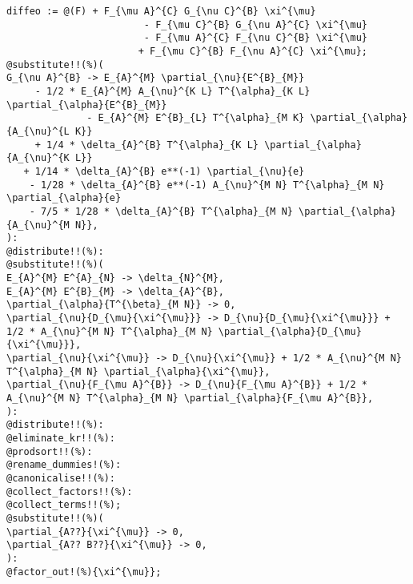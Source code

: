 \documentclass[11pt]{article}
\begin{document}
{\color[named]{Blue}\begin{verbatim}
diffeo := @(F) + F_{\mu A}^{C} G_{\nu C}^{B} \xi^{\mu}
                        - F_{\mu C}^{B} G_{\nu A}^{C} \xi^{\mu}
                        - F_{\mu A}^{C} F_{\nu C}^{B} \xi^{\mu}
                       + F_{\mu C}^{B} F_{\nu A}^{C} \xi^{\mu};
@substitute!!(%)(
G_{\nu A}^{B} -> E_{A}^{M} \partial_{\nu}{E^{B}_{M}}
     - 1/2 * E_{A}^{M} A_{\nu}^{K L} T^{\alpha}_{K L} \partial_{\alpha}{E^{B}_{M}}
              - E_{A}^{M} E^{B}_{L} T^{\alpha}_{M K} \partial_{\alpha}{A_{\nu}^{L K}}
     + 1/4 * \delta_{A}^{B} T^{\alpha}_{K L} \partial_{\alpha}{A_{\nu}^{K L}}
   + 1/14 * \delta_{A}^{B} e**(-1) \partial_{\nu}{e}
    - 1/28 * \delta_{A}^{B} e**(-1) A_{\nu}^{M N} T^{\alpha}_{M N} \partial_{\alpha}{e}
    - 7/5 * 1/28 * \delta_{A}^{B} T^{\alpha}_{M N} \partial_{\alpha}{A_{\nu}^{M N}},
):
@distribute!!(%):
@substitute!!(%)(
E_{A}^{M} E^{A}_{N} -> \delta_{N}^{M},
E_{A}^{M} E^{B}_{M} -> \delta_{A}^{B},
\partial_{\alpha}{T^{\beta}_{M N}} -> 0,
\partial_{\nu}{D_{\mu}{\xi^{\mu}}} -> D_{\nu}{D_{\mu}{\xi^{\mu}}} + 1/2 * A_{\nu}^{M N} T^{\alpha}_{M N} \partial_{\alpha}{D_{\mu}{\xi^{\mu}}},
\partial_{\nu}{\xi^{\mu}} -> D_{\nu}{\xi^{\mu}} + 1/2 * A_{\nu}^{M N} T^{\alpha}_{M N} \partial_{\alpha}{\xi^{\mu}},
\partial_{\nu}{F_{\mu A}^{B}} -> D_{\nu}{F_{\mu A}^{B}} + 1/2 * A_{\nu}^{M N} T^{\alpha}_{M N} \partial_{\alpha}{F_{\mu A}^{B}},
):
@distribute!!(%):
@eliminate_kr!!(%):
@prodsort!!(%):
@rename_dummies!(%):
@canonicalise!!(%):
@collect_factors!!(%):
@collect_terms!!(%);
@substitute!!(%)(
\partial_{A??}{\xi^{\mu}} -> 0,
\partial_{A?? B??}{\xi^{\mu}} -> 0,
):
@factor_out!(%){\xi^{\mu}};
\end{verbatim}}
\end{document}
